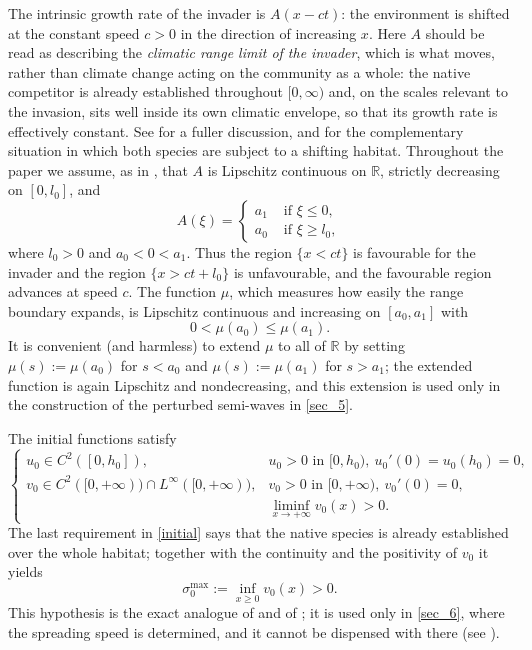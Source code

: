 \documentclass[reqno]{amsart}
\theoremstyle{plain}
\theoremstyle{definition}
\theoremstyle{remark}
\begin{document}
The intrinsic growth rate of the invader is $A(x-ct)$: the environment is shifted
at the constant speed $c>0$ in the direction of increasing $x$. Here $A$ should be
read as describing the \emph{climatic range limit of the invader}, which is what
moves, rather than climate change acting on the community as a whole: the native
competitor is already established throughout $[0,\infty)$ and, on the scales
relevant to the invasion, sits well inside its own climatic envelope, so that its
growth rate is effectively constant. See \cite[Remark 4]{DLN2026a} for a fuller
discussion, and \cite{Lei2018} for the complementary situation in which both
species are subject to a shifting habitat. Throughout the
paper we assume, as in \cite{HU20205931,DLN2026a}, that $A$ is Lipschitz
continuous on $\mathbb{R}$, strictly decreasing on $[0,l_0]$, and
\begin{equation}\label{A}
	A(\xi) =
	\begin{cases}
		a_1 & \text{ if } \xi \leq 0,\\
		a_0 & \text{ if } \xi \geq l_0,
	\end{cases}
\end{equation}
where $l_0 > 0$ and $a_0 < 0 < a_1$. Thus the region $\{x<ct\}$ is favourable for
the invader and the region $\{x>ct+l_0\}$ is unfavourable, and the favourable
region advances at speed $c$. The function $\mu$, which measures how easily the
range boundary expands, is Lipschitz continuous and increasing on $[a_0,a_1]$
with
\begin{equation}\label{mu}
	0 < \mu(a_0) \le \mu(a_1).
\end{equation}
It is convenient (and harmless) to extend $\mu$ to all of $\mathbb{R}$ by setting
$\mu(s):=\mu(a_0)$ for $s<a_0$ and $\mu(s):=\mu(a_1)$ for $s>a_1$; the extended
function is again Lipschitz and nondecreasing, and this extension is used only in
the construction of the perturbed semi-waves in \cref{sec_5}.

The initial functions satisfy
\begin{equation}\label{initial}
	\begin{cases}
		u_0 \in C^2([0,h_0]),& u_0 > 0 \text{ in } [0,h_0), ~ u_0'(0) = u_0(h_0) = 0,\\
		v_0 \in C^2([0,+\infty)) \cap L^\infty([0,+\infty)),& v_0 > 0 \text{ in } [0,+\infty), ~ v_0'(0) = 0,\\
		&\displaystyle\liminf_{x\to+\infty} v_0(x) > 0.
	\end{cases}
\end{equation}
The last requirement in \eqref{initial} says that the native species is already
established over the whole habitat; together with the continuity and the
positivity of $v_0$ it yields
\begin{equation}\label{v0inf}
	\sigma_0^{\max}:=\inf_{x\ge0} v_0(x) > 0 .
\end{equation}
This hypothesis is the exact analogue of \cite[(1.4)]{MR3986328} and of
\cite[(1.6)]{MR3609207}; it is used only in \cref{sec_6}, where the spreading
speed is determined, and it cannot be dispensed with there (see
\cite[Remark 3.5]{MR3609207}).
\end{document}
